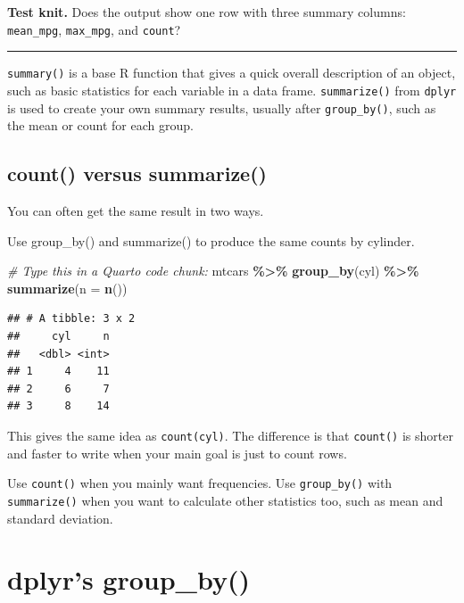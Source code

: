 \documentclass[
]{article}
\newenvironment{Shaded}{\begin{snugshade}}{\end{snugshade}}
\newcommand{\AttributeTok}[1]{\textcolor[rgb]{0.13,0.29,0.53}{#1}}
\newcommand{\CommentTok}[1]{\textcolor[rgb]{0.56,0.35,0.01}{\textit{#1}}}
\newcommand{\FunctionTok}[1]{\textcolor[rgb]{0.13,0.29,0.53}{\textbf{#1}}}
\newcommand{\NormalTok}[1]{#1}
\newcommand{\SpecialCharTok}[1]{\textcolor[rgb]{0.81,0.36,0.00}{\textbf{#1}}}
\begin{document}
\textbf{Test knit.} Does the output show one row with three summary
columns: \texttt{mean\_mpg}, \texttt{max\_mpg}, and \texttt{count}?

\begin{center}\rule{0.5\linewidth}{0.5pt}\end{center}

\texttt{summary()} is a base R function that gives a quick overall
description of an object, such as basic statistics for each variable in
a data frame. \texttt{summarize()} from \texttt{dplyr} is used to create
your own summary results, usually after \texttt{group\_by()}, such as
the mean or count for each group.

\subsection{count() versus summarize()}\label{count-versus-summarize}

You can often get the same result in two ways.

Use group\_by() and summarize() to produce the same counts by cylinder.

\begin{Shaded}
\begin{Highlighting}[]
\CommentTok{\#  Type this in a Quarto code chunk:}
\NormalTok{mtcars }\SpecialCharTok{\%\textgreater{}\%}
  \FunctionTok{group\_by}\NormalTok{(cyl) }\SpecialCharTok{\%\textgreater{}\%}
  \FunctionTok{summarize}\NormalTok{(}\AttributeTok{n =} \FunctionTok{n}\NormalTok{())}
\end{Highlighting}
\end{Shaded}

\begin{verbatim}
## # A tibble: 3 x 2
##     cyl     n
##   <dbl> <int>
## 1     4    11
## 2     6     7
## 3     8    14
\end{verbatim}

This gives the same idea as \texttt{count(cyl)}. The difference is that
\texttt{count()} is shorter and faster to write when your main goal is
just to count rows.

Use \texttt{count()} when you mainly want frequencies. Use
\texttt{group\_by()} with \texttt{summarize()} when you want to
calculate other statistics too, such as mean and standard deviation.

\section{dplyr's group\_by()}\label{dplyrs-group_by}
\end{document}
